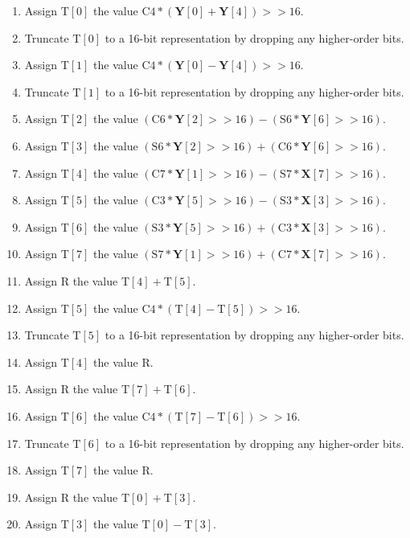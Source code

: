 \documentclass[9pt,letterpaper]{book}
\newcommand{\bitvar}[1]{\ensuremath{\mathbf{\bm{#1}}}}
\newcommand{\locvar}[1]{\ensuremath{\mathrm{#1}}}
\numberwithin{equation}{chapter}
\numberwithin{figure}{chapter}
\numberwithin{table}{chapter}
\begin{document}
\begin{enumerate}
\item
Assign $\locvar{T}[0]$ the value
 $\locvar{C4}*(\bitvar{Y}[0]+\bitvar{Y}[4])>>16$.
\item
Truncate $\locvar{T}[0]$ to a 16-bit representation by dropping any
 higher-order bits.
\item
Assign $\locvar{T}[1]$ the value
 $\locvar{C4}*(\bitvar{Y}[0]-\bitvar{Y}[4])>>16$.
\item
Truncate $\locvar{T}[1]$ to a 16-bit representation by dropping any
 higher-order bits.
\item
Assign $\locvar{T}[2]$ the value $(\locvar{C6}*\bitvar{Y}[2]>>16)-
 (\locvar{S6}*\bitvar{Y}[6]>>16)$.
\item
Assign $\locvar{T}[3]$ the value $(\locvar{S6}*\bitvar{Y}[2]>>16)+
 (\locvar{C6}*\bitvar{Y}[6]>>16)$.
\item
Assign $\locvar{T}[4]$ the value $(\locvar{C7}*\bitvar{Y}[1]>>16)-
 (\locvar{S7}*\bitvar{X}[7]>>16)$.
\item
Assign $\locvar{T}[5]$ the value $(\locvar{C3}*\bitvar{Y}[5]>>16)-
 (\locvar{S3}*\bitvar{X}[3]>>16)$.
\item
Assign $\locvar{T}[6]$ the value $(\locvar{S3}*\bitvar{Y}[5]>>16)+
 (\locvar{C3}*\bitvar{X}[3]>>16)$.
\item
Assign $\locvar{T}[7]$ the value $(\locvar{S7}*\bitvar{Y}[1]>>16)+
 (\locvar{C7}*\bitvar{X}[7]>>16)$.
\item
Assign \locvar{R} the value $\locvar{T}[4]+\locvar{T}[5]$.
\item
Assign $\locvar{T}[5]$ the value
 $\locvar{C4}*(\locvar{T}[4]-\locvar{T}[5])>>16$.
\item
Truncate $\locvar{T}[5]$ to a 16-bit representation by dropping any
 higher-order bits.
\item
Assign $\locvar{T}[4]$ the value $\locvar{R}$.
\item
Assign \locvar{R} the value $\locvar{T}[7]+\locvar{T}[6]$.
\item
Assign $\locvar{T}[6]$ the value
 $\locvar{C4}*(\locvar{T}[7]-\locvar{T}[6])>>16$.
\item
Truncate $\locvar{T}[6]$ to a 16-bit representation by dropping any
 higher-order bits.
\item
Assign $\locvar{T}[7]$ the value $\locvar{R}$.
\item
Assign \locvar{R} the value $\locvar{T}[0]+\locvar{T}[3]$.
\item
Assign $\locvar{T}[3]$ the value $\locvar{T}[0]-\locvar{T}[3]$.

\end{enumerate}
\end{document}
